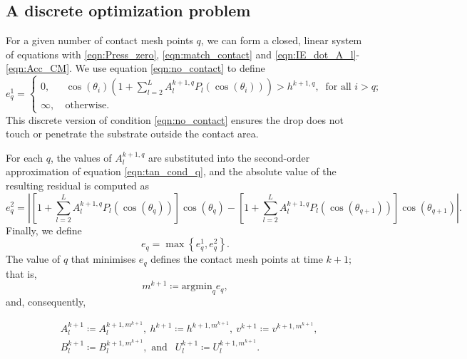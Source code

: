 \documentclass{jfm}
\begin{document}
\subsection{A discrete optimization problem} \label{subsubsec:adiscreteoptimizationproblem}

For a given number of contact mesh points $q$, we can form a closed, linear system of equations with \eqref{eqn:Press_zero}, \eqref{eqn:match_contact} and \eqref{eqn:IE_dot_A_l}-\eqref{eqn:Acc_CM}. We use equation \eqref{eqn:no_contact} to define 
\begin{equation}\label{eqn:cases_impenetrability}
    e^1_q
    =
    \begin{cases}
        0,\  &\cos(\theta_i)\left(1+\sum\limits_{l=2}^{L} {A_l^{k+1, q}P_l\left(\cos(\theta_i)\right)}\right) > h^{k+1, q},
    \  \text{ for all } i > q; \\
        \infty,\  &\text{otherwise}.
    \end{cases}
\end{equation}
This discrete version of condition \eqref{eqn:no_contact} ensures the drop does not touch or penetrate the substrate outside the contact area.

For each $q$, the values of $A_l^{k+1,q}$  are substituted into the second-order approximation of equation \eqref{eqn:tan_cond_q}, and the absolute value of the resulting residual is computed as
\begin{equation}\label{eqn:discrete_tangential_error}
    e^2_q = \left|
    \left[1+
    \sum\limits_{l=2}^{L} {A_l^{k+1, q}P_l\left(\cos(\theta_q)\right)}
    \right]\cos\left(\theta_q\right)
    -
    \left[1+
    \sum\limits_{l=2}^{L} {A_l^{k+1, q}P_l\left(\cos(\theta_{q+1})\right)}
    \right]\cos\left(\theta_{q+1}\right)
    \right|.
\end{equation}
Finally, we define
\begin{equation}
    e_q = \max \left\{e^1_q,e^2_q\right\}.
\end{equation}
The value of $q$ that minimises $e_q$ defines the contact mesh points at time $k+1$; that is,
\begin{equation}\label{eqn:Objective_func_discrete}
    m^{k+1} 
    \coloneqq 
    \text{argmin}_q 
    e_q,
\end{equation}
and, consequently,

\begin{align}
    & A_l^{k+1} \coloneqq A_l^{k+1,m^{k+1}}, \ h^{k+1} \coloneqq h^{k+1,m^{k+1}}, \
    v^{k+1} \coloneqq v^{k+1,m^{k+1}}, \\
    & B_l^{k+1} \coloneqq B_l^{k+1,m^{k+1}}, 
    \text{ and }\ \ 
    U_l^{k+1} \coloneqq U_l^{k+1,m^{k+1}}.
\end{align}
\end{document}
